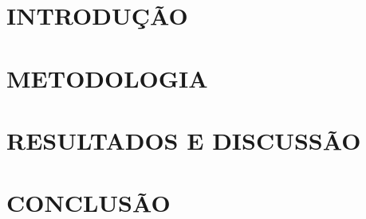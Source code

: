 \documentclass[a4paper, 12pt]{article}
\begin{document}
    

    \section{INTRODUÇÃO}
    

    \section{METODOLOGIA} 
    

    \section{RESULTADOS E DISCUSSÃO}
    

    \section{CONCLUSÃO}
    

    
    
    
\end{document}
